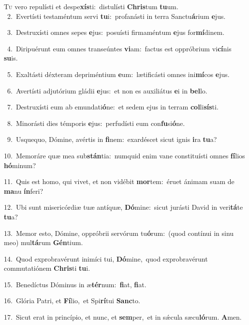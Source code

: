 \lettrine{\initial\textcolor{\initialcolor}{T}}{u} vero repulísti et despe\-\textbf{xís}\-ti:~\star distulísti \textbf{Chris}\-tum \textbf{tu}\-um.\\
{\numbfont\textcolor{\numbcolor}{~2.}}~Evertísti testaméntum servi \textbf{tu}\-i:~\star profanásti in terra Sanctu\-\textbf{á}\-rium \textbf{e}\-jus.\par
{\numbfont\textcolor{\numbcolor}{~3.}}~Destruxísti omnes sepes \textbf{e}\-jus:~\star posuísti firmaméntum \textbf{e}\-jus for\-\textbf{mí}\-dinem.\par
{\numbfont\textcolor{\numbcolor}{~4.}}~Diripuérunt eum omnes transeúntes \textbf{vi}\-am:~\star factus est oppróbrium vi\-\textbf{cí}\-nis \textbf{su}\-is.\par
{\numbfont\textcolor{\numbcolor}{~5.}}~Exaltásti déxteram depriméntium \textbf{e}\-um:~\star lætificásti omnes ini\-\textbf{mí}\-cos \textbf{e}\-jus.\par
{\numbfont\textcolor{\numbcolor}{~6.}}~Avertísti adjutórium gládii \textbf{e}\-jus:~\star et non es auxiliátus \textbf{e}\-i in \textbf{bel}\-lo.\par
{\numbfont\textcolor{\numbcolor}{~7.}}~Destruxísti eum ab emundati\-\textbf{ó}\-ne:~\star et sedem ejus in terram \textbf{col}\-li\-\textbf{sís}\-ti.\par
{\numbfont\textcolor{\numbcolor}{~8.}}~Minorásti dies témporis \textbf{e}\-jus:~\star perfudísti eum con\-\textbf{fu}\-si\-\textbf{ó}\-ne.\par
{\numbfont\textcolor{\numbcolor}{~9.}}~Usquequo, Dómine, avértis in \textbf{fi}\-nem:~\star exardéscet sicut ignis \textbf{i}\-ra \textbf{tu}\-a?\par
{\numbfont\textcolor{\numbcolor}{10.}}~Memoráre quæ mea sub\-\textbf{stán}\-tia:~\star numquid enim vane constituísti omnes \textbf{fí}\-lios \textbf{hó}\-minum?\par
{\numbfont\textcolor{\numbcolor}{11.}}~Quis est homo, qui vivet, et non vidébit \textbf{mor}\-tem:~\star éruet ánimam suam de \textbf{ma}\-nu \textbf{ín}\-feri?\par
{\numbfont\textcolor{\numbcolor}{12.}}~Ubi sunt misericórdiæ tuæ antíquæ, \textbf{Dó}\-mine:~\star sicut jurásti David in veri\-\textbf{tá}\-te \textbf{tu}\-a?\par
{\numbfont\textcolor{\numbcolor}{13.}}~Memor esto, Dómine, oppróbrii servórum tu\-\textbf{ó}\-rum:~\star (quod contínui in sinu meo) mul\-\textbf{tá}\-rum \textbf{Gén}\-tium.\par
{\numbfont\textcolor{\numbcolor}{14.}}~Quod exprobravérunt inimíci tui, \textbf{Dó}\-mine,~\star quod exprobravérunt commutatiónem \textbf{Chris}\-ti \textbf{tu}\-i.\par
{\numbfont\textcolor{\numbcolor}{15.}}~Benedíctus Dóminus in æ\-\textbf{tér}\-num:~\star \textbf{fi}\-at, \textbf{fi}\-at.\par
{\numbfont\textcolor{\numbcolor}{16.}}~Glória Patri, et \textbf{Fí}\-lio,~\star et Spi\-\textbf{rí}\-tui \textbf{Sanc}\-to.\par
{\numbfont\textcolor{\numbcolor}{17.}}~Sicut erat in princípio, et nunc, et \textbf{sem}\-per,~\star et in sǽcula sæcu\-\textbf{ló}\-rum. \textbf{A}\-men.\par
